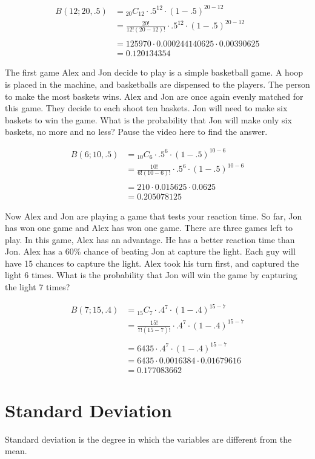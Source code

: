 \documentclass{article}
\newcommand*{\Comb}[2]{{}_{#1}C_{#2}}%
\newcommand*{\RComb}[2]{\frac{#1!}{#2!(#1-#2)!}}%
\newcommand*{\Binom}[3]{B(#1; #2, #3) & = \Comb{#2}{#1} \cdot {#3}^{#1} \cdot (1-{#3})^{{#2}-{#1}}}%
\newcommand*{\RBinom}[3]{& = \RComb{#2}{#1} \cdot {#3}^{#1} \cdot (1-#3)^{{#2}-{#1}} \\}%
\begin{document}
\begin{equation}
\begin{split}
\Binom{12}{20}{.5} \\
\RBinom{12}{20}{.5} \\
& = 125970 \cdot 0.000244140625 \cdot 0.00390625 \\
& = 0.120134354
\end{split}
\end{equation}

The first game Alex and Jon decide to play is a simple basketball game. A hoop is placed in the machine, and basketballs are dispensed to the players. The person to make the most baskets wins. Alex and Jon are once again evenly matched for this game. They decide to each shoot ten baskets. Jon will need to make six baskets to win the game. What is the probability that Jon will make only six baskets, no more and no less? Pause the video here to find the answer.

\begin{equation}
\begin{split}
\Binom{6}{10}{.5} \\
\RBinom{6}{10}{.5} \\
& = 210 \cdot 0.015625 \cdot  0.0625 \\
& = 0.205078125
\end{split}
\end{equation}

Now Alex and Jon are playing a game that tests your reaction time. So far, Jon has won one game and Alex has won one game. There are three games left to play. In this game, Alex has an advantage. He has a better reaction time than Jon. Alex has a 60\% chance of beating Jon at capture the light. Each guy will have 15 chances to capture the light. Alex took his turn first, and captured the light 6 times. What is the probability that Jon will win the game by capturing the light 7 times?

\begin{equation}
\begin{split}
\Binom{7}{15}{.4} \\
\RBinom{7}{15}{.4} \\
& = 6435 \cdot .4^7 \cdot (1-.4)^{15-7} \\
& = 6435 \cdot 0.0016384 \cdot 0.01679616 \\
& = 0.177083662
\end{split}
\end{equation}

\section{Standard Deviation}
Standard deviation is the degree in which the variables are different from the mean.
\end{document}
